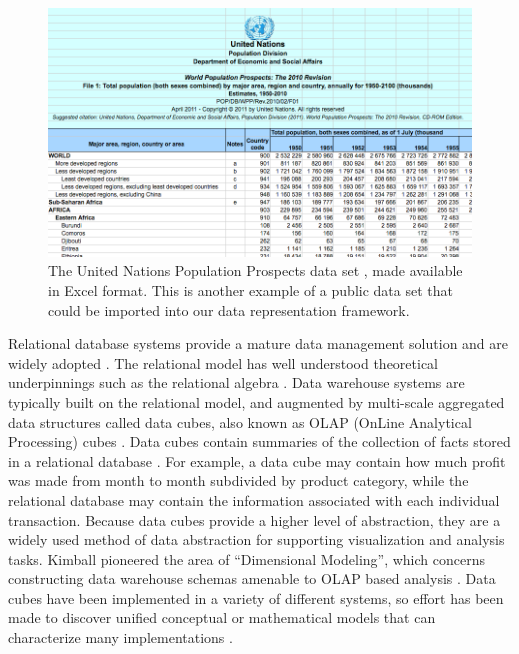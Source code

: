\documentclass[12pt]{article}
\begin{document}
\begin{doublespace}
\begin{figure}[h!]
  \centering
  \includegraphics[width=\textwidth]{figures/UN_World_Population_Spreadsheet.png}
  \caption[United Nations population estimates spreadsheet.]
   {The United Nations Population Prospects data set \cite{unPopData}, made available in Excel format. This is another example of a public data set that could be imported into our data representation framework.}
  \label{fig:unPopExcel}
\end{figure}

Relational database systems provide a mature data management solution and are widely adopted \cite{ramakrishnan2000database}. The relational model has well understood theoretical underpinnings such as the relational algebra \cite{clifford1985algebra}. Data warehouse systems are typically built on the relational model, and augmented by multi-scale aggregated data structures called data cubes, also known as OLAP (OnLine Analytical Processing) cubes \cite{gray1997data} \cite{codd1993providing}. Data cubes contain summaries of the collection of facts stored in a relational database \cite{chaudhuri1997overview}. For example, a data cube may contain how much profit was made from month to month subdivided by product category, while the relational database may contain the information associated with each individual transaction. Because data cubes provide a higher level of abstraction, they are a widely used method of data abstraction for supporting visualization and analysis tasks. Kimball pioneered the area of ``Dimensional Modeling'', which concerns constructing data warehouse schemas amenable to OLAP based analysis \cite{kimball1998data}. Data cubes have been implemented in a variety of different systems, so effort has been made to discover unified conceptual or mathematical models that can characterize many implementations \cite{datta1999cube} \cite{vassiliadis1999survey} \cite{vassiliadis1998modeling} \cite{li1996data} \cite{agrawal1997modeling} \cite{gyssens1997foundation} \cite{blaschka1998finding}.


\end{doublespace}
\end{document}
